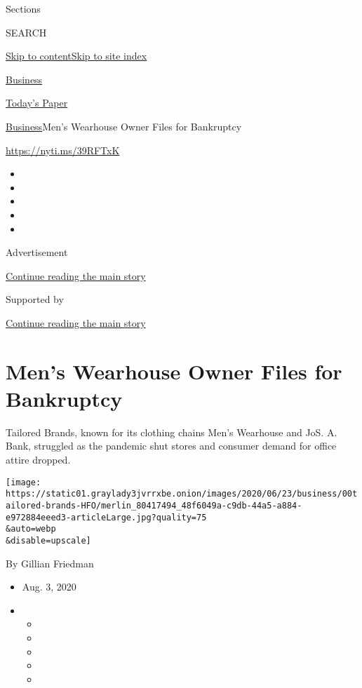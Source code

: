 Sections

SEARCH

\protect\hyperlink{site-content}{Skip to
content}\protect\hyperlink{site-index}{Skip to site index}

\href{https://www.nytimes3xbfgragh.onion/section/business}{Business}

\href{https://myaccount.nytimes3xbfgragh.onion/auth/login?response_type=cookie\&client_id=vi}{}

\href{https://www.nytimes3xbfgragh.onion/section/todayspaper}{Today's
Paper}

\href{/section/business}{Business}\textbar{}Men's Wearhouse Owner Files
for Bankruptcy

\url{https://nyti.ms/39RFTxK}

\begin{itemize}
\item
\item
\item
\item
\item
\end{itemize}

Advertisement

\protect\hyperlink{after-top}{Continue reading the main story}

Supported by

\protect\hyperlink{after-sponsor}{Continue reading the main story}

\hypertarget{mens-wearhouse-owner-files-for-bankruptcy}{%
\section{Men's Wearhouse Owner Files for
Bankruptcy}\label{mens-wearhouse-owner-files-for-bankruptcy}}

Tailored Brands, known for its clothing chains Men's Wearhouse and JoS.
A. Bank, struggled as the pandemic shut stores and consumer demand for
office attire dropped.

\texttt{[image: https://static01.graylady3jvrrxbe.onion/images/2020/06/23/business/00tailored-brands-HFO/merlin\_80417494\_48f6049a-c9db-44a5-a884-e972884eeed3-articleLarge.jpg?quality=75\\\&auto=webp\\\&disable=upscale]}

By Gillian Friedman

\begin{itemize}
\item
  Aug. 3, 2020
\item
  \begin{itemize}
  \item
  \item
  \item
  \item
  \item
  \end{itemize}
\end{itemize}


